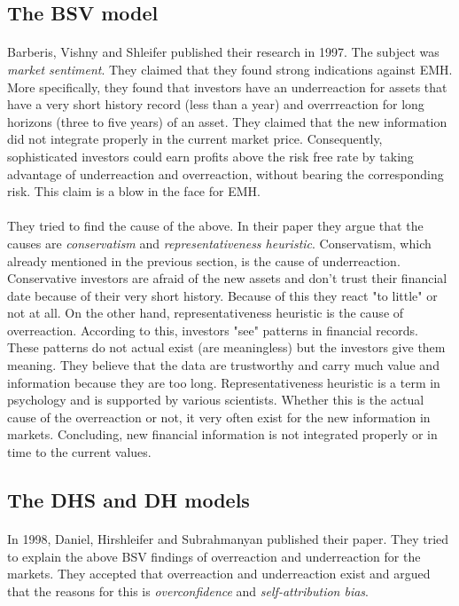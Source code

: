 \documentclass{article}
\begin{document}
\subsection{The BSV model}
\paragraph{ }
Barberis, Vishny and Shleifer published their research in 1997. The subject was \emph{market sentiment}. They claimed that they found strong indications against EMH. More specifically, they found that investors have an underreaction for assets that have a very short history record (less than a year) and overrreaction for long horizons (three to five years) of an asset. They claimed that the new information did not integrate properly in the current market price. Consequently, sophisticated investors could earn profits above the risk free rate by taking advantage of underreaction and overreaction, without bearing the corresponding risk. This claim is a blow in the face for EMH.
\paragraph{ }
They tried to find the cause of the above. In their paper they argue that the causes are \emph{conservatism} and \emph{representativeness heuristic}. Conservatism, which already mentioned in the previous section, is the cause of underreaction. Conservative investors are afraid of the new assets and don't trust their financial date because of their very short history. Because of this they react "to little" or not at all. On the other hand, representativeness heuristic is the cause of overreaction. According to this, investors "see" patterns in financial records. These patterns do not actual exist (are meaningless) but the investors give them meaning. They believe that the data are trustworthy and carry much value and information because they are too long. Representativeness heuristic is a term in psychology and is supported by various scientists. Whether this is the actual cause of the overreaction  or not, it very often exist for the new information in markets. Concluding, new financial information is not integrated properly or in time to the current values.

\subsection{The DHS and DH models}
\paragraph{ }
In 1998, Daniel, Hirshleifer and Subrahmanyan published their paper. They tried to explain the above BSV findings of overreaction and underreaction for the markets. They accepted that overreaction and underreaction exist and argued that the reasons for this is \emph{overconfidence} and \emph{self-attribution bias}. 
\end{document}
